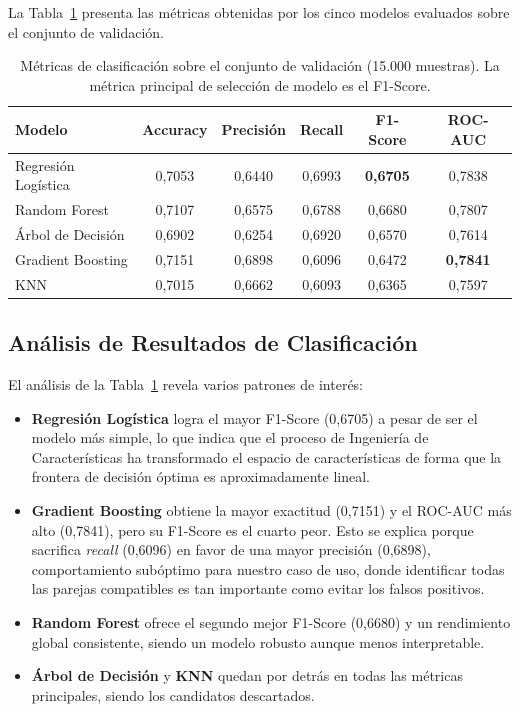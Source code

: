 La Tabla~\ref{tab:resultados_clasificacion_val} presenta las métricas obtenidas por los cinco modelos evaluados sobre el conjunto de validación.

\begin{table}[H]
\centering
\begin{tabular}{lccccc}
\hline
\textbf{Modelo} & \textbf{Accuracy} & \textbf{Precisión} & \textbf{Recall} & \textbf{F1-Score} & \textbf{ROC-AUC} \\ \hline
Regresión Logística & 0,7053 & 0,6440 & 0,6993 & \textbf{0,6705} & 0,7838 \\
Random Forest       & 0,7107 & 0,6575 & 0,6788 & 0,6680 & 0,7807 \\
Árbol de Decisión   & 0,6902 & 0,6254 & 0,6920 & 0,6570 & 0,7614 \\
Gradient Boosting   & 0,7151 & 0,6898 & 0,6096 & 0,6472 & \textbf{0,7841} \\
KNN                 & 0,7015 & 0,6662 & 0,6093 & 0,6365 & 0,7597 \\ \hline
\end{tabular}
\caption{Métricas de clasificación sobre el conjunto de validación (15.000 muestras). La métrica principal de selección de modelo es el F1-Score.}
\label{tab:resultados_clasificacion_val}
\end{table}

\subsection{Análisis de Resultados de Clasificación}

El análisis de la Tabla~\ref{tab:resultados_clasificacion_val} revela varios patrones de interés:

\begin{itemize}
    \item \textbf{Regresión Logística} logra el mayor F1-Score (0,6705) a pesar de ser el modelo más simple, lo que indica que el proceso de Ingeniería de Características ha transformado el espacio de características de forma que la frontera de decisión óptima es aproximadamente lineal.

    \item \textbf{Gradient Boosting} obtiene la mayor exactitud (0,7151) y el ROC-AUC más alto (0,7841), pero su F1-Score es el cuarto peor. Esto se explica porque sacrifica \textit{recall} (0,6096) en favor de una mayor precisión (0,6898), comportamiento subóptimo para nuestro caso de uso, donde identificar todas las parejas compatibles es tan importante como evitar los falsos positivos.

    \item \textbf{Random Forest} ofrece el segundo mejor F1-Score (0,6680) y un rendimiento global consistente, siendo un modelo robusto aunque menos interpretable.

    \item \textbf{Árbol de Decisión} y \textbf{KNN} quedan por detrás en todas las métricas principales, siendo los candidatos descartados.
\end{itemize}

